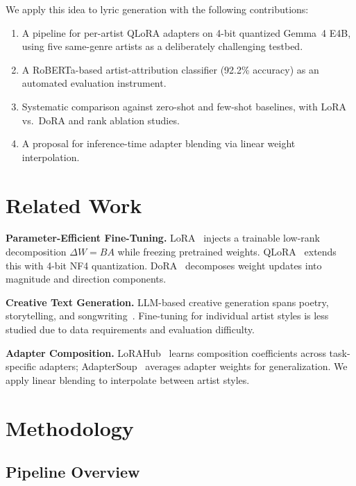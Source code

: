 \documentclass[runningheads]{llncs}
\begin{document}
We apply this idea to lyric generation with the following contributions:
\begin{enumerate}
    \item A pipeline for per-artist QLoRA adapters on 4-bit quantized Gemma~4 E4B, using five same-genre artists as a deliberately challenging testbed.
    \item A RoBERTa-based artist-attribution classifier (92.2\% accuracy) as an automated evaluation instrument.
    \item Systematic comparison against zero-shot and few-shot baselines, with LoRA vs.\ DoRA and rank ablation studies.
    \item A proposal for inference-time adapter blending via linear weight interpolation.
\end{enumerate}

\section{Related Work}
\label{sec:related}

\textbf{Parameter-Efficient Fine-Tuning.}
LoRA~\cite{hu2022lora} injects a trainable low-rank decomposition $\Delta W = BA$ while freezing pretrained weights. QLoRA~\cite{dettmers2023qlora} extends this with 4-bit NF4 quantization. DoRA~\cite{liu2024dora} decomposes weight updates into magnitude and direction components.

\textbf{Creative Text Generation.}
LLM-based creative generation spans poetry, storytelling, and songwriting~\cite{vonrutte2023language}. Fine-tuning for individual artist styles is less studied due to data requirements and evaluation difficulty.

\textbf{Adapter Composition.}
LoRAHub~\cite{zhang2023lorahub} learns composition coefficients across task-specific adapters; AdapterSoup~\cite{chronopoulou2023adaptersoup} averages adapter weights for generalization. We apply linear blending to interpolate between artist styles.

\section{Methodology}
\label{sec:method}

\subsection{Pipeline Overview}
\end{document}
